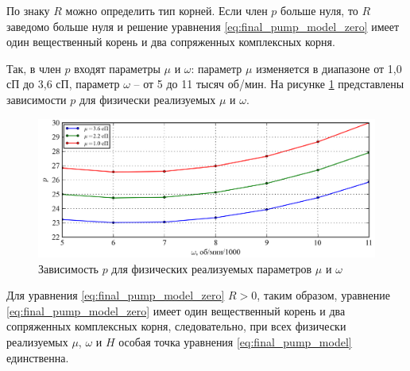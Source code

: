 По знаку $R$ можно определить тип корней. Если член $p$ больше нуля, то $R$ заведомо больше нуля и решение уравнения \eqref{eq:final_pump_model_zero} имеет один вещественный корень и два сопряженных комплексных корня. %

Так, в член $p$ входят параметры $\mu$ и $\omega$: параметр $\mu$ изменяется в диапазоне от 1,0 сП до 3,6 сП, параметр $\omega$ -- от 5 до 11 тысяч об/мин. На рисунке \ref{img:model_zero_roots} представлены зависимости $p$ для физически реализуемых $\mu$ и $\omega$.

\begin{figure}[ht] 
  \center
  \includegraphics [scale=1.0] {../images/c2_model_zero}
  \caption{Зависимость $p$ для физических реализуемых параметров $\mu$ и $\omega$}
  \label{img:model_zero_roots}  
\end{figure}

Для уравнения \eqref{eq:final_pump_model_zero} $R > 0$, таким образом, уравнение \eqref{eq:final_pump_model_zero} имеет один вещественный корень и два сопряженных комплексных корня, следовательно, при всех физически реализуемых $\mu$, $\omega$ и $H$ особая точка уравнения \eqref{eq:final_pump_model} единственна.


